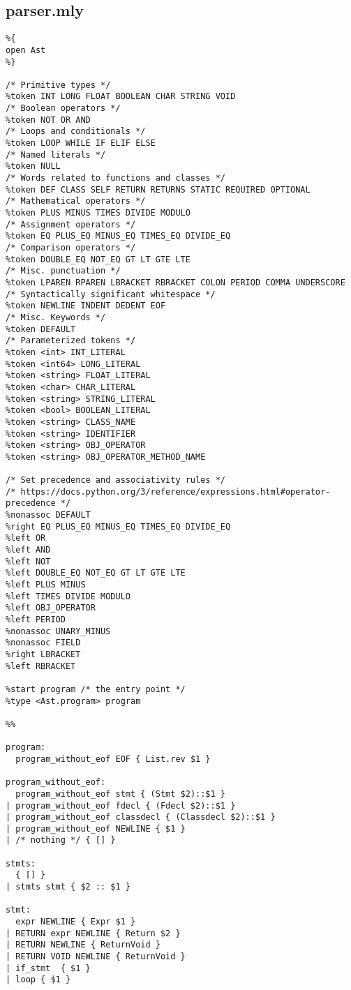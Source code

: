 \documentclass{article}
\begin{document}
\subsection{parser.mly}
\label{sec:parsermly}

\begin{verbatim}
%{
open Ast
%}

/* Primitive types */
%token INT LONG FLOAT BOOLEAN CHAR STRING VOID
/* Boolean operators */
%token NOT OR AND
/* Loops and conditionals */
%token LOOP WHILE IF ELIF ELSE
/* Named literals */
%token NULL
/* Words related to functions and classes */
%token DEF CLASS SELF RETURN RETURNS STATIC REQUIRED OPTIONAL
/* Mathematical operators */
%token PLUS MINUS TIMES DIVIDE MODULO
/* Assignment operators */
%token EQ PLUS_EQ MINUS_EQ TIMES_EQ DIVIDE_EQ
/* Comparison operators */
%token DOUBLE_EQ NOT_EQ GT LT GTE LTE
/* Misc. punctuation */
%token LPAREN RPAREN LBRACKET RBRACKET COLON PERIOD COMMA UNDERSCORE
/* Syntactically significant whitespace */
%token NEWLINE INDENT DEDENT EOF
/* Misc. Keywords */
%token DEFAULT
/* Parameterized tokens */
%token <int> INT_LITERAL
%token <int64> LONG_LITERAL
%token <string> FLOAT_LITERAL
%token <char> CHAR_LITERAL
%token <string> STRING_LITERAL
%token <bool> BOOLEAN_LITERAL
%token <string> CLASS_NAME
%token <string> IDENTIFIER
%token <string> OBJ_OPERATOR
%token <string> OBJ_OPERATOR_METHOD_NAME

/* Set precedence and associativity rules */
/* https://docs.python.org/3/reference/expressions.html#operator-precedence */
%nonassoc DEFAULT
%right EQ PLUS_EQ MINUS_EQ TIMES_EQ DIVIDE_EQ
%left OR
%left AND
%left NOT
%left DOUBLE_EQ NOT_EQ GT LT GTE LTE
%left PLUS MINUS
%left TIMES DIVIDE MODULO
%left OBJ_OPERATOR
%left PERIOD
%nonassoc UNARY_MINUS
%nonassoc FIELD
%right LBRACKET
%left RBRACKET

%start program /* the entry point */
%type <Ast.program> program

%%

program:
  program_without_eof EOF { List.rev $1 }

program_without_eof:
  program_without_eof stmt { (Stmt $2)::$1 }
| program_without_eof fdecl { (Fdecl $2)::$1 }
| program_without_eof classdecl { (Classdecl $2)::$1 }
| program_without_eof NEWLINE { $1 }
| /* nothing */ { [] }

stmts:
  { [] }
| stmts stmt { $2 :: $1 }

stmt:
  expr NEWLINE { Expr $1 }
| RETURN expr NEWLINE { Return $2 }
| RETURN NEWLINE { ReturnVoid }
| RETURN VOID NEWLINE { ReturnVoid }
| if_stmt  { $1 }
| loop { $1 }


\end{verbatim}
\end{document}
